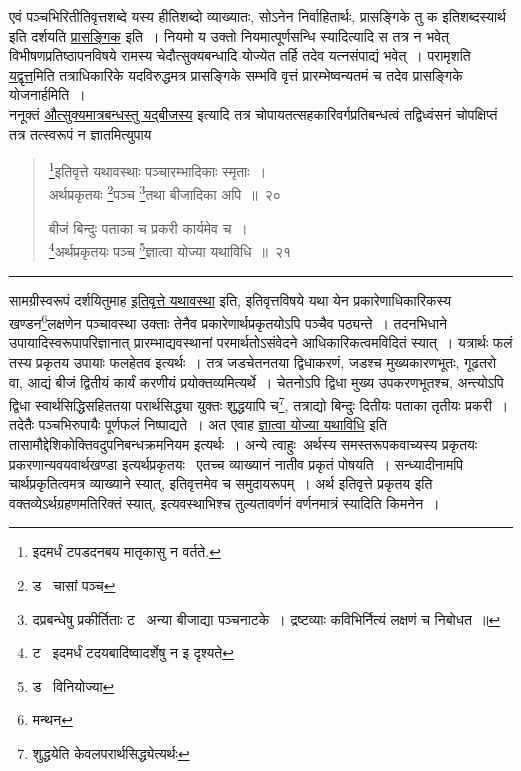 \documentclass[11pt, openany]{book}
\begin{document}
एवं पञ्चभिरितीतिवृत्तशब्दे यस्य हीतिशब्दो व्याख्यातः, सोऽनेन निर्वाहितार्थः, प्रासङ्गिके तु क इतिशब्दस्यार्थ इति दर्शयति \underline{प्रासङ्गिक} इति~। नियमो य उक्तो नियमात्पूर्णसन्धि स्यादित्यादि स तत्र न भवेत् विभीषणप्रतिष्ठापनविषये रामस्य चेदौत्सुक्यबन्धादि योज्येत तर्हि तदेव यत्नसंपाद्यं भवेत्~। परामृशति \underline{यद्वृत्त}मिति तत्राधिकारिके यदविरुद्धमत्र प्रासङ्गिके सम्भवि वृत्तं प्रारम्भेष्वन्यतमं च तदेव प्रासङ्गिके योजनार्हमिति~।\\

ननूक्तं \underline{औत्सुक्यमात्रबन्धस्तु यद्बीजस्य} इत्यादि तत्र चोपायतत्सहकारिवर्गप्रतिबन्धत्वं तद्विध्वंसनं चोपक्षिप्तं तत्र तत्स्वरूपं न ज्ञातमित्युपाय \textendash

\newpage

\begin{quote}
{\na \renewcommand{\thefootnote}{1}\footnote{इदमर्धं टपडदनबय मातृकासु न वर्तते.}इतिवृत्ते यथावस्थाः पञ्चारम्भादिकाः स्मृताः~।\\
अर्थप्रकृतयः \renewcommand{\thefootnote}{2}\footnote{ड \textendash\ चासां पञ्च}पञ्च \renewcommand{\thefootnote}{3}\footnote{दप्रबन्धेषु प्रकीर्तिताः ट \textendash\ अन्या बीजाद्या पञ्चनाटके~। द्रष्टव्याः कविभिर्नित्यं लक्षणं च निबोधत~॥}तथा बीजादिका अपि~॥~२०

बीजं बिन्दुः पताका च प्रकरी कार्यमेव च~।\\
\renewcommand{\thefootnote}{4}\footnote{ट \textendash\ इदमर्धं टदयबादिष्वादर्शेषु न इ दृश्यते}अर्थप्रकृतयः पञ्च \renewcommand{\thefootnote}{5}\footnote{ड \textendash\ विनियोज्या}ज्ञात्वा योज्या यथाविधि~॥~२१}
\end{quote}

\hrule

\vspace{2mm}
\noindent
सामग्रीस्वरूपं दर्शयितुमाह \underline{इतिवृत्ते यथावस्था} इति, इतिवृत्तविषये यथा येन प्रकारेणाधिकारिकस्य खण्डन\renewcommand{\thefootnote}{1}\footnote{मन्थन}लक्षणेन पञ्चावस्था उक्ताः तेनैव प्रकारेणार्थप्रकृतयोऽपि पञ्चैव पठ्यन्ते~। तदनभिधाने उपायादिस्वरूपापरिज्ञानात् प्रारम्भाद्यवस्थानां परमार्थतोऽसंवेदने आधिकारिकत्वमविदितं स्यात्~। यत्रार्थः फलं तस्य प्रकृतय उपायाः फलहेतव इत्यर्थः~। तत्र जडचेतनतया द्विधाकरणं, जडश्च मुख्यकारणभूतः, गूढतरो वा, आद्यं बीजं द्वितीयं कार्यं करणीयं प्रयोक्तव्यमित्यर्थे~। चेतनोऽपि द्विधा मुख्य उपकरणभूतश्च, अन्त्योऽपि द्विधा स्वार्थसिद्धिसहिततया परार्थसिद्ध्या युक्तः शुद्धयापि च\renewcommand{\thefootnote}{*}\footnote{शुद्धयेति केवलपरार्थसिद्ध्येत्यर्थः}, तत्राद्यो बिन्दुः दितीयः पताका तृतीयः प्रकरी~। तदेतैः पञ्चभिरुपायैः पूर्णफलं निष्पाद्यते~। अत एवाह \underline{ज्ञात्वा योज्या यथाविधि} इति तासामौद्देशिकोक्तिवदुपनिबन्धक्रमनियम इत्यर्थः~। अन्ये त्वाहुः\textendash\ अर्थस्य समस्तरूपकवाच्यस्य प्रकृतयः प्रकरणान्यवयवार्थखण्डा इत्यर्थप्रकृतयः \textendash\ एतच्च व्याख्यानं नातीव प्रकृतं पोषयति~। सन्ध्यादीनामपि चार्थप्रकृतित्वमत्र व्याख्याने स्यात्, इतिवृत्तमेव च समुदायरूपम्~। अर्थ इतिवृत्ते प्रकृतय इति वक्तव्येऽर्थग्रहणमतिरिक्तं स्यात्, इत्यवस्थाभिश्च तुल्यतावर्णनं वर्णनमात्रं स्यादिति किमनेन~।
\end{document}

